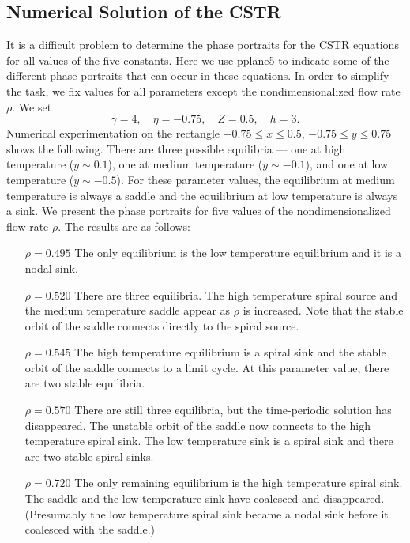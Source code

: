 \documentclass{ximera}
\begin{document}
\subsection*{Numerical Solution of the CSTR}

It is a difficult problem to determine the phase portraits for
the CSTR equations for all values of the five constants. Here we
use {\sf pplane5} to indicate some of the different phase
portraits that can occur in these equations.  In order to
simplify the task, we fix values for all parameters except
the nondimensionalized flow rate $\rho$.  We set
\begin{equation}   \label{e:CSTRparam}
\gamma=4, \quad \eta=-0.75, \quad Z=0.5, \quad h =3.
\end{equation}
Numerical experimentation on the rectangle $-0.75\leq x
\leq 0.5$, $-0.75\leq y\leq 0.75$ shows the following.  There are 
three possible equilibria --- one at high temperature ($y\sim 0.1$), 
one at medium temperature ($y\sim -0.1$), and one at low
temperature ($y\sim -0.5$).  For these parameter values, the 
equilibrium at medium temperature is always a saddle and the 
equilibrium at low temperature is always a 
sink.  We present the 
phase portraits for five values of the nondimensionalized 
flow rate
$\rho$.  The results are as follows:  
\begin{itemize}
\item[$\rho=0.495$] The only equilibrium is the low temperature 
equilibrium and it is a nodal sink. 
\item[$\rho=0.520$] There are three equilibria. The high 
temperature spiral source and the medium temperature saddle appear
as $\rho$ is increased.  Note that the stable orbit of the 
saddle connects directly to the spiral source.
\item[$\rho=0.545$] The high temperature equilibrium is a spiral 
sink and the stable orbit of the saddle connects to a limit 
cycle.  At this parameter value, there are two stable equilibria.
 
\item[$\rho=0.570$] There are still three equilibria, but the 
time-periodic solution has disappeared.  The unstable orbit of 
the saddle now connects to the high temperature spiral sink. The
low temperature sink is a spiral sink and there are two stable
spiral sinks. 
\item[$\rho=0.720$] The only remaining equilibrium is the high
temperature spiral sink.  The saddle and the low temperature 
sink have coalesced and disappeared.  (Presumably the low temperature 
spiral sink became a nodal sink before it coalesced with the saddle.)
\end{itemize}
\end{document}
